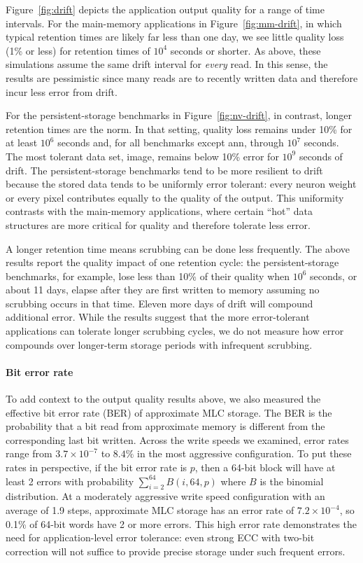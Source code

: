 \documentclass[prodmode,acmtocs]{acmsmall}
\begin{document}
Figure~\ref{fig:drift} depicts the application output quality for a range of
time intervals.
For the main-memory applications in Figure~\ref{fig:mm-drift}, in which typical retention times are
likely far less than one day, we see little quality loss (1\% or
less) for retention times of $10^4$ seconds or shorter.
As above, these simulations assume the same drift interval for \emph{every}
read.
In this sense, the results are pessimistic since many reads
are to recently written data and therefore incur less error from
drift.

For the
persistent-storage benchmarks in Figure~\ref{fig:nv-drift}, in contrast, longer retention times are the
norm.
In that setting, quality loss remains under 10\% for at least
$10^6$ seconds and, for all benchmarks except \textsf{ann}, through $10^7$ seconds.
The most tolerant data set, \textsf{image}, remains below 10\% error for
$10^9$ seconds of drift.
The persistent-storage benchmarks tend to be more resilient to drift because
the stored data tends to be uniformly error tolerant: every neuron weight or
every pixel contributes equally to the quality of the output.
This uniformity contrasts with the main-memory applications, where certain
``hot'' data structures are more critical for quality and therefore
tolerate less error.

A longer retention time means scrubbing can be done less frequently.
The above results report the quality impact of one retention cycle:
the persistent-storage benchmarks, for example, lose less than 10\%
of their quality when $10^6$ seconds, or about 11 days, elapse after they are
first written to memory assuming no scrubbing occurs in that time.
Eleven more days of drift will compound additional error.
While the results suggest that the more error-tolerant applications can
tolerate longer scrubbing cycles, we do not measure how error compounds over
longer-term storage periods with infrequent scrubbing.

\paragraph{Bit error rate}

To add context to the output quality results above, we also measured the
effective bit error rate (BER) of approximate MLC storage. The BER is the
probability that a bit read from approximate memory is different from
the corresponding last bit written.
Across the write speeds we examined, error rates range from $3.7
\times 10^{-7}$ to $8.4\%$ in the most aggressive configuration.
%
To put these rates in perspective, if the bit error rate is $p$, then a 64-bit
block will have at least 2 errors with probability $\sum_{i = 2}^{64} B(i, 64,
p)$ where $B$ is the binomial distribution. At a moderately aggressive write
speed configuration with an average of 1.9 steps, approximate MLC storage has
an error rate of $7.2 \times 10^{-4}$, so 0.1\% of 64-bit
words have 2 or more errors. This high error rate demonstrates the need
for application-level error tolerance: even strong ECC with two-bit correction
will not suffice to provide precise storage under such frequent errors.
\end{document}
